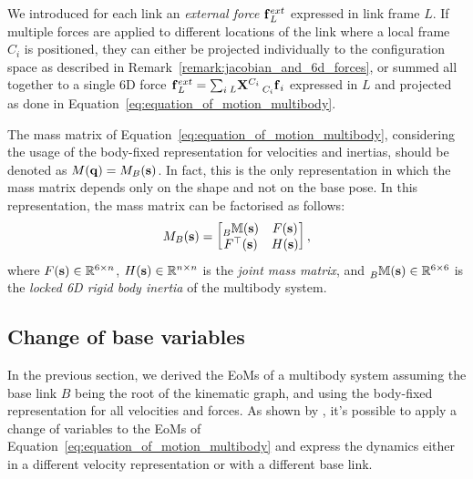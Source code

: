 \begin{remark*}
%
We introduced for each link an \emph{external force} $\forcesix_L^{ext}$ expressed in link frame $L$.
If multiple forces are applied to different locations of the link where a local frame $C_i$ is positioned, they can either be projected individually to the configuration space as described in Remark~\ref{remark:jacobian_and_6d_forces}, or summed all together to a single 6D force $\forcesix_L^{ext} = \sum_i \transfor[L]^{C_i} \forcesix[C_i]_i$ expressed in $L$ and projected as done in Equation~\eqref{eq:equation_of_motion_multibody}.
%
\end{remark*}

\begin{remark*}
\label{remark:mass_matrix_structure}
%
The mass matrix of Equation~\eqref{eq:equation_of_motion_multibody}, considering the usage of the body-fixed representation for velocities and inertias, should be denoted as $M(\Qu) = M_B(\Shape)$.
In fact, this is the only representation in which the mass matrix depends only on the shape and not on the base pose.
In this representation, the mass matrix can be factorised as follows:
%
\begin{equation*}
    M_B(\Shape) =
    \begin{bmatrix}
        \masssix[B](\Shape) & F(\Shape) \\
        F^\top(\Shape) & H(\Shape)
    \end{bmatrix}
    ,
\end{equation*}
%
where $F(\Shape) \in \realn^{6\times n}$, $H(\Shape) \in \realn^{n\times n}$ is the \emph{joint mass matrix}, and $\masssix[B](\Shape) \in \realn^{6\times 6}$ is the \emph{locked 6D rigid body inertia} of the multibody system.
%
\end{remark*}

\subsection{Change of base variables}
\label{sec:change_of_base_variables}

In the previous section, we derived the \acp{EoM} of a multibody system assuming the base link $B$ being the root of the kinematic graph, and using the body-fixed representation for all velocities and forces.
As shown by \textcite[Section~3.6]{traversaro_modelling_2017}, it's possible to apply a change of variables to the \acp{EoM} of Equation~\eqref{eq:equation_of_motion_multibody} and express the dynamics either in a different velocity representation or with a different base link.

